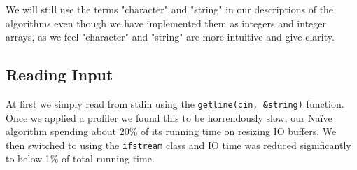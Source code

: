 We will still use the terms "character" and "string" in our descriptions of the algorithms even though we have implemented them as integers and integer arrays, as we feel "character" and "string" are more intuitive and give clarity.


\subsection{Reading Input}
At first we simply read from stdin using the \texttt{getline(cin, \&string)} function. Once we applied a profiler we found this to be horrendously slow, our Naïve algorithm spending about 20\% of its running time on resizing IO buffers. We then switched to using the \texttt{ifstream} class and IO time was reduced significantly to below 1\% of total running time.